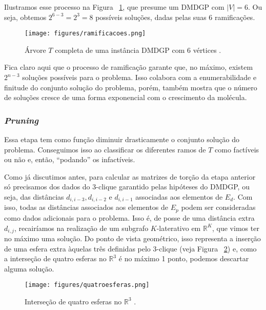 Ilustramos esse processo na Figura ~\ref{fig:ramificacoes}, que presume um DMDGP com $|V| = 6$. Ou seja, obtemos $2^{6-3} = 2^3 = 8$ possíveis soluções, dadas pelas suas 6 ramificações.

\begin{figure}[H]
	\begin{center}
		\texttt{[image: figures/ramificacoes.png]}
	\end{center}
	\caption{Árvore $T$ completa de uma instância DMDGP com 6 vértices \cite{fidalgotese}.}
	\label{fig:ramificacoes}
\end{figure}

Fica claro aqui que o processo de ramificação garante que, no máximo, existem $2^{n-3}$ soluções possíveis para o problema. Isso colabora com a enumerabilidade e finitude do conjunto solução do problema, porém, também mostra que o número de soluções cresce de uma forma exponencial com o crescimento da molécula.

\subsubsection*{\textit{Pruning}}
Essa etapa tem como função diminuir drasticamente o conjunto solução do problema. Conseguimos isso ao classificar os diferentes ramos de $T$ como factíveis ou não e, então, ``podando'' os infactíveis.  

Como já discutimos antes, para calcular as matrizes de torção da etapa anterior só precisamos dos dados do 3-clique garantido pelas hipóteses do DMDGP, ou seja, das distâncias $d_{i,i-3}, d_{i,i-2}$ e $d_{i,i-1}$ associadas aos elementos de $E_d$. Com isso, todas as distâncias associados aos elementos de $E_p$ podem ser consideradas como dados adicionais para o problema. 
Isso é, de posse de uma distância extra $d_{i,j}$, recairíamos na realização de um subgrafo $K$-laterativo em $\mathbb{R}^K$, que vimos ter no máximo uma solução. Do ponto de vista geométrico, isso representa a inserção de uma esfera extra àquelas três definidas pelo 3-clique (veja Figura ~\ref{fig:quatroesferas}) e, como a interseção de quatro esferas no $\mathbb{R}^3$ é no máximo 1 ponto, podemos descartar alguma solução.

\begin{figure}[H]
	\begin{center}
		\texttt{[image: figures/quatroesferas.png]}
	\end{center}
	\caption{Interseção de quatro esferas no $\mathbb{R}^3$ \cite{carlileBook31Coloquio}.}
	\label{fig:quatroesferas}
\end{figure}

